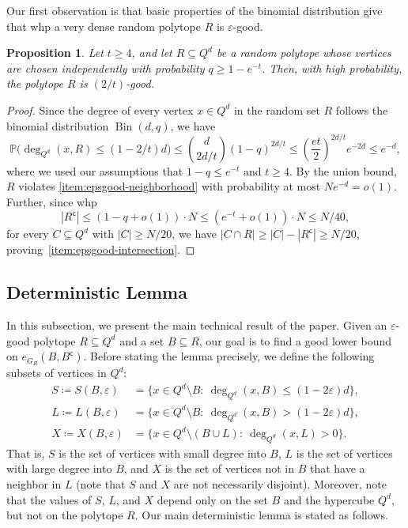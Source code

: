 \documentclass[11pt,a4paper,oneside,reqno]{amsart}
\newtheorem{proposition}[theorem]{Proposition}
\newcommand{\PP}{\mathbb{P}}
\DeclareMathOperator{\Bin}{Bin}
\newcommand{\eps}{\varepsilon}
\begin{document}
Our first observation is that basic properties of the binomial distribution give that whp a very dense random polytope $R$ is $\eps$-good.

\begin{proposition}\label{prop:Risgood}
  Let $t\geq4$, and let $R\subseteq Q^d$ be a random polytope whose vertices are chosen independently with probability $q\geq 1-e^{-t}$. Then, with high probability, the polytope $R$ is $(2/t)$-good.
\end{proposition}

\begin{proof}
  Since the degree of every vertex $x\in Q^d$ in the random set $R$ follows the binomial distribution $\Bin(d,q)$, we have
  \[
    \PP\bigl(\deg_{Q^d}(x, R) \le (1-2/t)d\bigr) \leq \binom{d}{2d/t} (1-q)^{2d/t} \leq \left(\frac{et}{2}\right)^{2d/t} e^{-2d} \le e^{-d},  \]
  where we used our assumptions that $1-q\leq e^{-t}$ and $t\geq4$.  By the union bound, $R$ violates \ref{item:epsgood-neighborhood} with probability at most $Ne^{-d}=o(1)$.  Further, since whp
  \[
    |R^{\mathsf{c}}| \le (1-q+o(1)) \cdot N \le (e^{-t} + o(1)) \cdot N \le N/40,
  \]
  for every $C \subseteq Q^d$ with $|C| \ge N/20$, we have $|C \cap R| \ge |C| - |R^{\mathsf{c}}| \ge N/20$, proving~\ref{item:epsgood-intersection}.
\end{proof}

\subsection{Deterministic Lemma}

In this subsection, we present the main technical result of the paper.  Given an $\eps$-good polytope $R \subseteq Q^d$ and a set $B \subseteq R$, our goal is to find a good lower bound on $e_{G_R}(B,B^\mathsf{c})$.  Before stating the lemma precisely, we define the following subsets of vertices in $Q^d$:
\begin{align}\label{eq:SLX}
  S\coloneqq S(B,\eps)&=\{x\in Q^d\setminus B:\: \deg_{{Q^d}}(x, B)\leq (1-2\eps)d\},\nonumber\\
  L\coloneqq L(B,\eps)&=\{x\in Q^d \setminus B:\: \deg_{{Q^d}}(x, B)> (1-2\eps)d\},\\
  X\coloneqq X(B,\eps)&=\{x\in Q^d \setminus (B\cup L):\: \deg_{Q^d}(x,L)>0\}\nonumber.
\end{align}
That is, $S$ is the set of vertices with small degree into $B$, $L$ is the set of vertices with large degree into $B$, and $X$ is the set of vertices not in $B$ that have a neighbor in $L$ (note that $S$ and $X$ are not necessarily disjoint). Moreover, note that the values of $S$, $L$, and $X$ depend only on the set $B$ and the hypercube $Q^d$, but not on the polytope $R$. Our main deterministic lemma is stated as follows.
\end{document}
